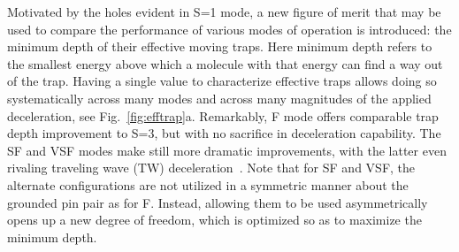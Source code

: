 Motivated by the holes evident in S=1 mode, a new figure of merit that may be used to compare the performance of various modes of operation is introduced: the minimum depth of their effective moving traps.
Here minimum depth refers to the smallest energy above which a molecule with that energy can find a way out of the trap.
Having a single value to characterize effective traps allows doing so systematically across many modes and across many magnitudes of the applied deceleration, see Fig.~\ref{fig:efftrap}a. Remarkably, F mode offers comparable trap depth improvement to S=3, but with no sacrifice in deceleration capability. 
The SF and VSF modes make still more dramatic improvements, with the latter even rivaling traveling wave (TW) deceleration~\cite{Osterwalder2010}. 
Note that for SF and VSF, the alternate configurations are not utilized in a symmetric manner about the grounded pin pair as for F. 
Instead, allowing them to be used asymmetrically opens up a new degree of freedom, which is optimized so as to maximize the minimum depth.


